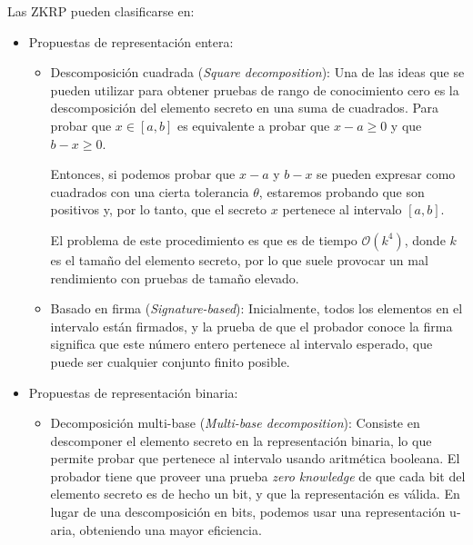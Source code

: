 Las ZKRP pueden clasificarse en:
\begin{itemize}
    \item Propuestas de representación entera:
    \begin{itemize}
        \item Descomposición cuadrada (\emph{Square decomposition}): 
        Una de las ideas que se pueden utilizar para obtener pruebas de rango de conocimiento cero es la descomposición del elemento secreto en una suma de cuadrados. Para probar que $x \in [a, b]$ es equivalente a probar que $x - a \geq 0$ y que $b - x \geq 0$.

        Entonces, si podemos probar que $x - a$ y $b - x$ se pueden expresar como cuadrados con una cierta tolerancia $\theta$, estaremos probando que son positivos y, por lo tanto, que el secreto $x$ pertenece al intervalo $[a, b]$.

        El problema de este procedimiento es que es de tiempo $\mathcal{O}(k^{4})$, donde $k$ es el tamaño del elemento secreto, por lo que suele provocar un mal rendimiento con pruebas de tamaño elevado.
        
        \item Basado en firma (\emph{Signature-based}):
        Inicialmente, todos los elementos en el intervalo están firmados, y la prueba de que el probador conoce la firma significa que este número entero pertenece al intervalo esperado, que puede ser cualquier conjunto finito posible.
    \end{itemize}
    \item Propuestas de representación binaria:
    \begin{itemize}
        \item Decomposición multi-base (\emph{Multi-base decomposition}):
        Consiste en descomponer el elemento secreto en la representación binaria, lo que permite probar que pertenece al intervalo usando aritmética booleana. El probador tiene que proveer una prueba \emph{zero knowledge} de que cada bit del elemento secreto es de hecho un bit, y que la representación es válida. En lugar de una descomposición en bits, podemos usar una representación u-aria, obteniendo una mayor eficiencia.
        

\end{itemize}
\end{itemize}
